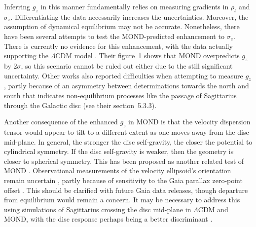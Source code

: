 \documentclass[fleqn,usenatbib,useAMS]{mnras} %
\begin{document}
Inferring $g_z$ in this manner fundamentally relies on measuring gradients in $\rho_t$ and $\sigma_z$. Differentiating the data necessarily increases the uncertainties. Moreover, the assumption of dynamical equilibrium may not be accurate. Nonetheless, there have been several attempts to test the MOND-predicted enhancement to $\sigma_z$. There is currently no evidence for this enhancement, with the data actually supporting the $\Lambda$CDM model \citep{Lisanti_2019}. Their figure~1 shows that MOND overpredicts $g_z$ by $2\sigma$, so this scenario cannot be ruled out either due to the still significant uncertainty. Other works also reported difficulties when attempting to measure $g_z$ \citep{Hagen_2018}, partly because of an asymmetry between determinations towards the north and south \citep{Guo_2020} that indicates non-equilibrium processes like the passage of Sagittarius through the Galactic disc (see their section~5.3.3).

Another consequence of the enhanced $g_z$ in MOND is that the velocity dispersion tensor would appear to tilt to a different extent as one moves away from the disc mid-plane. In general, the stronger the disc self-gravity, the closer the potential to cylindrical symmetry. If the disc self-gravity is weaker, then the geometry is closer to spherical symmetry. This has been proposed as another related test of MOND \citep{Bienayme_2009}. Observational measurements of the velocity ellipsoid's orientation remain uncertain \citep{Everall_2019}, partly because of sensitivity to the Gaia parallax zero-point offset \citep{Hagen_2019}. This should be clarified with future Gaia data releases, though departure from equilibrium would remain a concern. It may be necessary to address this using simulations of Sagittarius crossing the disc mid-plane in $\Lambda$CDM and MOND, with the disc response perhaps being a better discriminant \citep{Laporte_2018, Laporte_2019, Bennett_2022}.
\end{document}
